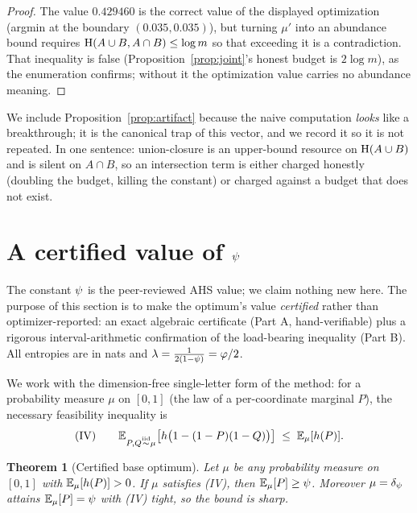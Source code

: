 \documentclass[11pt]{amsart}
\newtheorem{theorem}{Theorem}[section]
\theoremstyle{definition}
\theoremstyle{remark}
\begin{document}
\begin{proof}
The value $0.429460$ is the correct value of the displayed optimization (argmin at
the boundary $(0.035,0.035)$), but turning $\mu'$ into an abundance bound requires
$\operatorname{H}(A\cup B,A\cap B)\le\log m$ so that exceeding it is a contradiction. That
inequality is false (Proposition~\ref{prop:joint}'s honest budget is $2\log m$),
as the enumeration confirms; without it the optimization value carries no
abundance meaning.
\end{proof}

We include Proposition~\ref{prop:artifact} because the naive computation
\emph{looks} like a breakthrough; it is the canonical trap of this vector, and we
record it so it is not repeated. In one sentence: union-closure is an upper-bound
resource on $\operatorname{H}(A\cup B)$ and is silent on $A\cap B$, so an intersection term is
either charged honestly (doubling the budget, killing the constant) or charged
against a budget that does not exist.

\section{A certified value of \texorpdfstring{$\psi$}{psi}}
\label{sec:certificate}

The constant $\psi$ is the peer-reviewed AHS value; we claim nothing new here.
The purpose of this section is to make the optimum's value \emph{certified} rather
than optimizer-reported: an exact algebraic certificate (Part A,
hand-verifiable) plus a rigorous interval-arithmetic confirmation of the
load-bearing inequality (Part B). All entropies are in nats and
$\lambda=\tfrac{1}{2(1-\psi)}=\varphi/2$.

We work with the dimension-free single-letter form of the method: for a
probability measure $\mu$ on $[0,1]$ (the law of a per-coordinate marginal $P$),
the necessary feasibility inequality is
\begin{equation}\label{eq:IV}
   \text{(IV)}\qquad
   \mathbb{E}_{P,Q\overset{\text{iid}}\sim\mu}\bigl[h\bigl(1-(1-P)(1-Q)\bigr)\bigr]\;\le\;\mathbb{E}_\mu[h(P)] .
\end{equation}

\begin{theorem}[Certified base optimum]\label{thm:cert}
Let $\mu$ be any probability measure on $[0,1]$ with $\mathbb{E}_\mu[h(P)]>0$. If $\mu$
satisfies \textup{(IV)}, then $\mathbb{E}_\mu[P]\ge\psi$. Moreover $\mu=\delta_{\psi}$
attains $\mathbb{E}_\mu[P]=\psi$ with \textup{(IV)} tight, so the bound is sharp.
\end{theorem}
\end{document}
